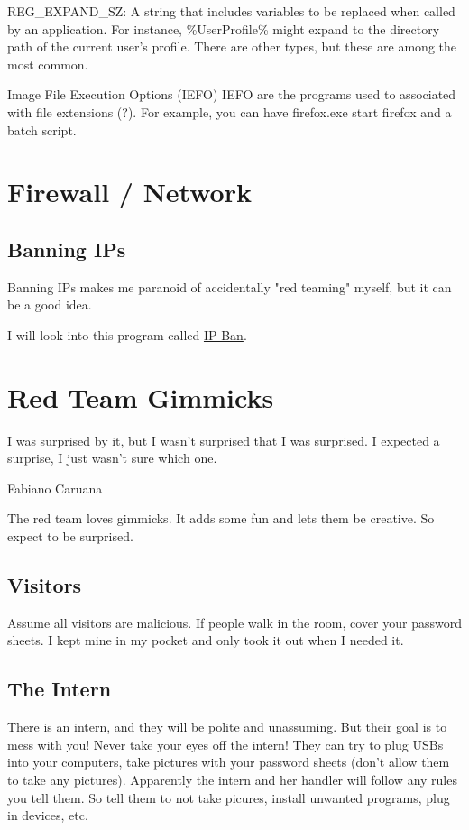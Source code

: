 \documentclass{article}
\begin{document}
REG\_EXPAND\_SZ: A string that includes variables to be replaced when called by an application. For instance, \%UserProfile\% might expand to the directory path of the current user's profile.
There are other types, but these are among the most common.

Image File Execution Options (IEFO)
IEFO are the programs used to associated with file extensions (?). For example, you
can have firefox.exe start firefox and a batch script.

\section{Firewall / Network}

\subsection{Banning IPs}
Banning IPs makes me paranoid of accidentally "red teaming" myself, but it can be a good idea.

I will look into this program called \href{https://github.com/DigitalRuby/IPBan}{IP Ban}.

\section{Red Team Gimmicks}
\epigraph{I was surprised by it, but I wasn’t surprised that I was surprised. I expected a surprise, I just wasn’t sure which one.}
{Fabiano Caruana}

The red team loves gimmicks. It adds some fun and lets them be creative. So expect to be surprised.

\subsection{Visitors}
Assume all visitors are malicious.
If people walk in the room, cover your password sheets. I kept mine in my pocket and only took it out when I needed it. 

\subsection{The Intern}
There is an intern, and they will be polite and unassuming. But their goal is to mess with you! Never take your eyes off the intern!
They can try to plug USBs into your computers, take pictures with your password sheets (don't allow them to take any pictures).
Apparently the intern and her handler will follow any rules you tell them. So tell them to not take picures, install unwanted programs, plug in devices, etc.
\end{document}
